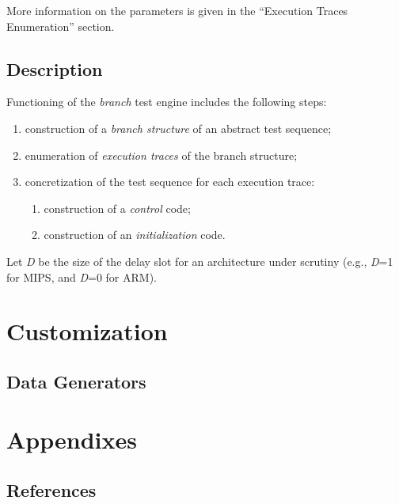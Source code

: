 \documentclass[oneside,final,12pt]{extreport}
\begin{document}
More information on the parameters is given in the “Execution Traces Enumeration” section.

\section{Description}

Functioning of the \emph{branch} test engine includes the following steps:

\begin{enumerate}
  \item construction of a \emph{branch structure} of an abstract test sequence;
  \item enumeration of \emph{execution traces} of the branch structure;
  \item concretization of the test sequence for each execution trace:
  \begin{enumerate}
    \item construction of a \emph{control} code;
    \item construction of an \emph{initialization} code.
  \end{enumerate}
\end{enumerate}

Let \emph{D} be the size of the delay slot for an architecture under scrutiny (e.g., \emph{D}=1
for MIPS, and \emph{D}=0 for ARM).


\chapter{Customization}

\section{Data Generators}


\chapter{Appendixes}

\section{References}
\end{document}
